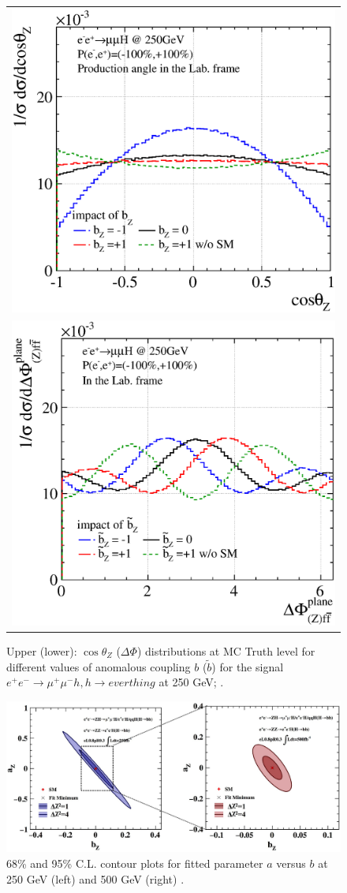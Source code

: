 \begin{figure}
\begin{tabular}[c]{c}
\includegraphics[width=0.85\hsize]{chapters/figures/ZH_anomHVV250_b.eps} \\
\includegraphics[width=0.85\hsize]{chapters/figures/ZH_anomHVV250_bt.eps} 
\end{tabular}
  \caption{Upper (lower): $\cos\theta_Z$ ($\Delta\Phi$) distributions at MC Truth level for different 
  values of anomalous coupling $b$ ($\tilde{b}$) 
  for the signal $e^+e^-\to \mu^+\mu^- h, h\to everthing$ at 250 GeV;
  \cite{Ogawa:2017bmg}.}
  \label{fig:ZHanomHVV1}
\end{figure}

\begin{figure}
\begin{center}
\includegraphics[width=0.85\hsize]{chapters/figures/ZH_anomHVV_ab.eps}
\end{center}
  \caption{68\% and 95\% C.L. contour plots for fitted parameter $a$ versus $b$ at 250 GeV (left)
  and 500 GeV (right) \cite{Ogawa:2017bmg}.}
  \label{fig:ZHanomHVV2}
\end{figure}
